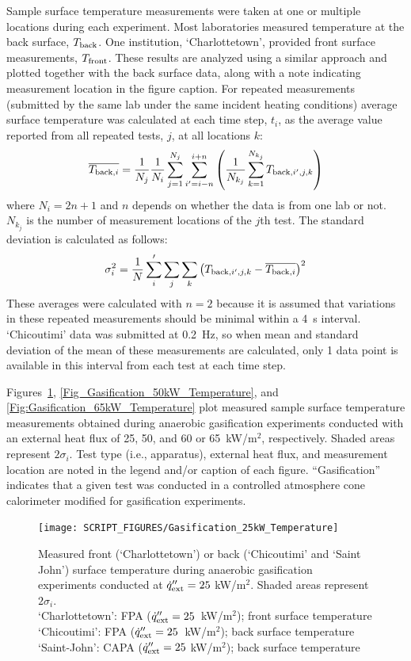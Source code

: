 \documentclass{book}
\begin{document}
Sample surface temperature measurements were taken at one or multiple locations during each experiment. Most laboratories measured temperature at the back surface, $T_{\rm back}$. One institution, ‘Charlottetown’, provided front surface measurements, $T_{\rm front}$. These results are analyzed using a similar approach and plotted together with the back surface data, along with a note indicating measurement location in the figure caption. For repeated measurements (submitted by the same lab under the same incident heating conditions) average surface temperature was calculated at each time step, $t_i$, as the average value reported from all repeated tests, $j$, at all locations $k$:
\begin{equation}
   \overline{ T_{{\rm back},i} } = \frac{1}{N_j} \frac{1}{N_i} \sum_{j=1}^{N_j}  \sum_{i'=i-n}^{i+n} \left( \frac{1}{N_{k_j}} \sum_{k=1}^{N_{k_j}} T_{{\rm back},i',j,k} \right)
\end{equation}
where $N_i=2n+1$ and $n$ depends on whether the data is from one lab or not. $N_{k_j}$ is the number of measurement locations of the $j$th test. The standard deviation is calculated as follows:
\begin{equation}
   \sigma_i^2 = \frac{1}{N} \sum_i' \sum_j \sum_k \left( T_{{\rm back},i',j,k} - \overline{ T_{{\rm back},i} } \right)^2
\end{equation}
These averages were calculated with $n=2$ because it is assumed that variations in these repeated measurements should be minimal within a 4~s interval. ‘Chicoutimi’ data was submitted at 0.2~Hz, so when mean and standard deviation of the mean of these measurements are calculated, only 1 data point is available in this interval from each test at each time step.

Figures~\ref{Fig:Gasification_25kW_Temperature}, \ref{Fig_Gasification_50kW_Temperature}, and \ref{Fig:Gasification_65kW_Temperature} plot measured sample surface temperature measurements obtained during anaerobic gasification experiments conducted with an external heat flux of 25, 50, and 60 or 65~kW/m$^2$, respectively. Shaded areas represent $2\sigma_i$. Test type (i.e., apparatus), external heat flux, and measurement location are noted in the legend and/or caption of each figure. ``Gasification'' indicates that a given test was conducted in a controlled atmosphere cone calorimeter modified for gasification experiments.

\begin{figure}
  \centering
  \texttt{[image: SCRIPT\_FIGURES/Gasification\_25kW\_Temperature]}
  \caption{Measured front (‘Charlottetown’) or back (‘Chicoutimi’ and ‘Saint John’) surface temperature during anaerobic gasification experiments conducted at $\dot{q}_{\rm ext}'' = 25$ kW/m$^2$. Shaded areas represent $2\sigma_i$. \\
‘Charlottetown’:  FPA ($\dot{q}_{\rm ext}'' = 25$~kW/m$^2$); front surface temperature \\
‘Chicoutimi’:   FPA ($\dot{q}_{\rm ext}'' = 25$~kW/m$^2$); back surface temperature \\
‘Saint-John’:   CAPA ($\dot{q}_{\rm ext}'' = 25$ kW/m$^2$); back surface temperature}
  \label{Fig:Gasification_25kW_Temperature}
\end{figure}
\end{document}
